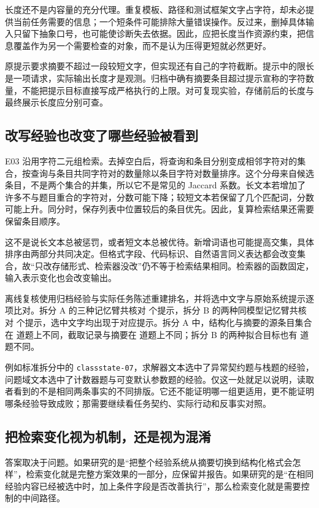 长度还不是内容量的充分代理。重复模板、路径和测试框架文字占字符，却未必提供当前任务需要的信息；一个短条件可能排除大量错误操作。反过来，删掉具体输入只留下抽象口号，也可能使诊断失去依据。因此，应把长度当作资源约束，把信息覆盖作为另一个需要检查的对象，而不是认为压得更短就必然更好。

原提示要求摘要不超过一段较短文字，但实现还有自己的字符截断。提示中的限长是一项请求，实际输出长度才是观测。归档中确有摘要条目超过提示宣称的字符数量，不能把提示目标直接写成严格执行的上限。对可复现实验，存储前后的长度与最终展示长度应分别可查。

\subsection{改写经验也改变了哪些经验被看到}

E03 沿用字符二元组检索。去掉空白后，将查询和条目分别变成相邻字符对的集合，按查询与条目共同字符对的数量除以条目字符对数量排序。这个分母来自候选条目，不是两个集合的并集，所以它不是常见的 Jaccard 系数。长文本若增加了许多不与题目重合的字符对，分数可能下降；较短文本若保留了几个匹配词，分数可能上升。同分时，保存列表中位置较后的条目优先。因此，复算检索结果还需要保留条目顺序。

这不是说长文本总被惩罚，或者短文本总被优待。新增词语也可能提高交集，具体排序由两部分共同决定。但格式字段、代码标识、自然语言同义表达都会改变集合，故“只改存储形式、检索器没改”仍不等于检索结果相同。检索器的函数固定，输入表示变化也会改变输出。

离线复核使用归档经验与实际任务陈述重建排名，并将选中文字与原始系统提示逐项比对。拆分 A 的三种记忆臂共核对  个提示，拆分 B 的两种同模型记忆臂共核对  个提示，选中文字均出现于对应提示。拆分 A 中，结构化与摘要的源条目集合在  道题上不同，截取记录与摘要在  道题上不同；拆分 B 的两种拟合目标也有  道题不同。

例如标准拆分中的 \texttt{classstate-07}，求解器文本选中了异常契约题与栈题的经验，问题域文本选中了计数器题与可变默认参数题的经验。仅这一处就足以说明，读取者看到的不是相同两条事实的不同排版。它还不能证明哪一组更适用，更不能证明哪条经验导致成败；那需要继续看任务契约、实际行动和反事实对照。

\subsection{把检索变化视为机制，还是视为混淆}

答案取决于问题。如果研究的是“把整个经验系统从摘要切换到结构化格式会怎样”，检索变化就是完整方案效果的一部分，应保留并报告。如果研究的是“在相同经验内容已经被选中时，加上条件字段是否改善执行”，那么检索变化就是需要控制的中间路径。

